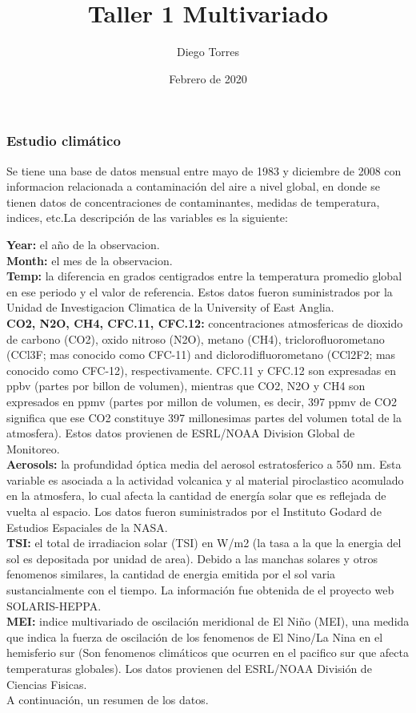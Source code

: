 \documentclass[]{article}
\title{Taller 1 Multivariado}
\author{Diego Torres}
\date{Febrero de 2020}
\begin{document}
\maketitle

\subsubsection{\texorpdfstring{\textbf{Estudio
climático}}{Estudio climático}}\label{estudio-climuxe1tico}

Se tiene una base de datos mensual entre mayo de 1983 y diciembre de
2008 con informacion relacionada a contaminación del aire a nivel
global, en donde se tienen datos de concentraciones de contaminantes,
medidas de temperatura, indices, etc.La descripción de las variables es
la siguiente:

\textbf{Year:} el año de la observacion.\\
\textbf{Month:} el mes de la observacion.\\
\textbf{Temp:} la diferencia en grados centigrados entre la temperatura
promedio global en ese periodo y el valor de referencia. Estos datos
fueron suministrados por la Unidad de Investigacion Climatica de la
University of East Anglia.\\
\textbf{CO2, N2O, CH4, CFC.11, CFC.12:} concentraciones atmosfericas de
dioxido de carbono (CO2), oxido nitroso (N2O), metano (CH4),
triclorofluorometano (CCl3F; mas conocido como CFC-11) and
diclorodifluorometano (CCl2F2; mas conocido como CFC-12),
respectivamente. CFC.11 y CFC.12 son expresadas en ppbv (partes por
billon de volumen), mientras que CO2, N2O y CH4 son expresados en ppmv
(partes por millon de volumen, es decir, 397 ppmv de CO2 significa que
ese CO2 constituye 397 millonesimas partes del volumen total de la
atmosfera). Estos datos provienen de ESRL/NOAA Division Global de
Monitoreo.\\
\textbf{Aerosols:} la profundidad óptica media del aerosol
estratosferico a 550 nm. Esta variable es asociada a la actividad
volcanica y al material piroclastico acomulado en la atmosfera, lo cual
afecta la cantidad de energía solar que es reflejada de vuelta al
espacio. Los datos fueron suministrados por el Instituto Godard de
Estudios Espaciales de la NASA.\\
\textbf{TSI:} el total de irradiacion solar (TSI) en W/m2 (la tasa a la
que la energia del sol es depositada por unidad de area). Debido a las
manchas solares y otros fenomenos similares, la cantidad de energia
emitida por el sol varia sustancialmente con el tiempo. La información
fue obtenida de el proyecto web SOLARIS-HEPPA.\\
\textbf{MEI:} indice multivariado de oscilación meridional de El Niño
(MEI), una medida que indica la fuerza de oscilación de los fenomenos de
El Nino/La Nina en el hemisferio sur (Son fenomenos climáticos que
ocurren en el pacifico sur que afecta temperaturas globales). Los datos
provienen del ESRL/NOAA División de Ciencias Fisicas.\\
A continuación, un resumen de los datos.
\end{document}
